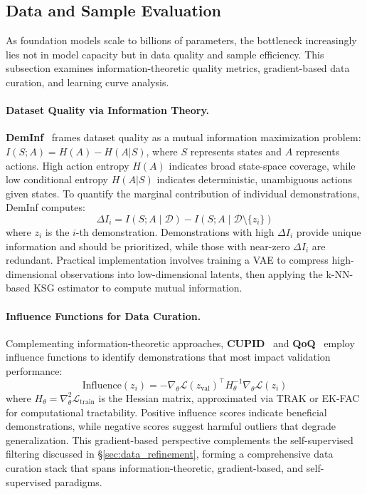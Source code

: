 \documentclass[acmsmall,screen,review,anonymous]{acmart}
\begin{document}
\subsection{Data and Sample Evaluation}\label{sec:eval_data_sample}

As foundation models scale to billions of parameters, the bottleneck increasingly lies not in model capacity but in data quality and sample efficiency. This subsection examines information-theoretic quality metrics, gradient-based data curation, and learning curve analysis.

\paragraph{Dataset Quality via Information Theory.}
\textbf{DemInf}~\cite{hejna2025robot} frames dataset quality as a mutual information maximization problem: $I(S; A) = H(A) - H(A|S)$, where $S$ represents states and $A$ represents actions. High action entropy $H(A)$ indicates broad state-space coverage, while low conditional entropy $H(A|S)$ indicates deterministic, unambiguous actions given states. To quantify the marginal contribution of individual demonstrations, DemInf computes:
\begin{equation}
  \Delta I_i = I(S; A \mid \mathcal{D}) - I(S; A \mid \mathcal{D} \setminus \{z_i\})
\end{equation}
where $z_i$ is the $i$-th demonstration. Demonstrations with high $\Delta I_i$ provide unique information and should be prioritized, while those with near-zero $\Delta I_i$ are redundant. Practical implementation involves training a VAE to compress high-dimensional observations into low-dimensional latents, then applying the k-NN-based KSG estimator to compute mutual information.

\paragraph{Influence Functions for Data Curation.}
Complementing information-theoretic approaches, \textbf{CUPID}~\cite{agia2025cupidcuratingdatarobot} and \textbf{QoQ}~\cite{lee2026qoq} employ influence functions to identify demonstrations that most impact validation performance:
\begin{equation}
  \text{Influence}(z_i) = -\nabla_\theta \mathcal{L}(z_{\text{val}})^\top H_\theta^{-1} \nabla_\theta \mathcal{L}(z_i)
\end{equation}
where $H_\theta = \nabla^2_\theta \mathcal{L}_{\text{train}}$ is the Hessian matrix, approximated via TRAK or EK-FAC for computational tractability. Positive influence scores indicate beneficial demonstrations, while negative scores suggest harmful outliers that degrade generalization. This gradient-based perspective complements the self-supervised filtering discussed in \S\ref{sec:data_refinement}, forming a comprehensive data curation stack that spans information-theoretic, gradient-based, and self-supervised paradigms.
\end{document}
